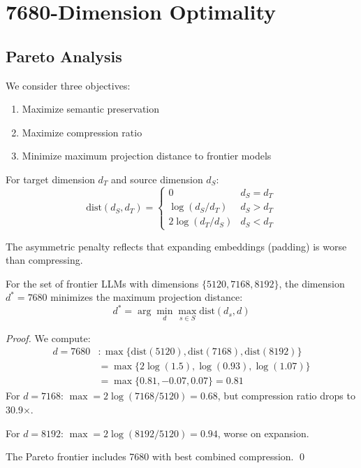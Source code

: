 \section{7680-Dimension Optimality}

\label{sec:optimality}

\subsection{Pareto Analysis}

We consider three objectives:
\begin{enumerate}
    \item Maximize semantic preservation
    \item Maximize compression ratio
    \item Minimize maximum projection distance to frontier models
\end{enumerate}

\begin{definition}
For target dimension $d_T$ and source dimension $d_S$:
\begin{equation}
\text{dist}(d_S, d_T) = \begin{cases}
0 & d_S = d_T \\
\log(d_S / d_T) & d_S > d_T \\
2\log(d_T / d_S) & d_S < d_T
\end{cases}
\end{equation}
\end{definition}

The asymmetric penalty reflects that expanding embeddings (padding) is worse than compressing.

\begin{theorem}[7680 Optimality]
For the set of frontier LLMs with dimensions $\{5120, 7168, 8192\}$, the dimension $d^* = 7680$ minimizes the maximum projection distance:
\begin{equation}
d^* = \arg\min_d \max_{s \in S} \text{dist}(d_s, d)
\end{equation}
\end{theorem}

\begin{proof}
We compute:
\begin{align}
d = 7680&: \max\{\text{dist}(5120), \text{dist}(7168), \text{dist}(8192)\} \\
&= \max\{2\log(1.5), \log(0.93), \log(1.07)\} \\
&= \max\{0.81, -0.07, 0.07\} = 0.81
\end{align}
For $d = 7168$: $\max = 2\log(7168/5120) = 0.68$, but compression ratio drops to 30.9$\times$.

For $d = 8192$: $\max = 2\log(8192/5120) = 0.94$, worse on expansion.

The Pareto frontier includes 7680 with best combined compression. \qed
\end{proof}

